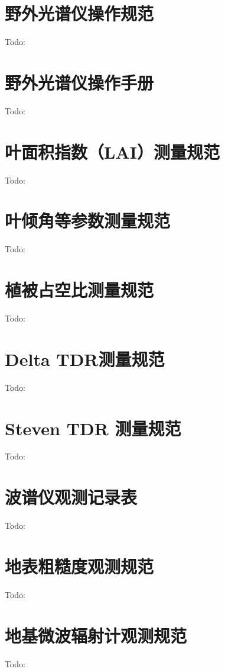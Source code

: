\documentclass[letterpaper,10pt,english]{sphinxmanual}
\begin{document}
\section{野外光谱仪操作规范}
\label{observe_standard:id6}
Todo:


\section{野外光谱仪操作手册}
\label{observe_standard:id7}
Todo:


\section{叶面积指数（LAI）测量规范}
\label{observe_standard:lai}
Todo:


\section{叶倾角等参数测量规范}
\label{observe_standard:id8}
Todo:


\section{植被占空比测量规范}
\label{observe_standard:id9}
Todo:


\section{Delta TDR测量规范}
\label{observe_standard:delta-tdr}
Todo:


\section{Steven TDR 测量规范}
\label{observe_standard:steven-tdr}
Todo:


\section{波谱仪观测记录表}
\label{observe_standard:id10}
Todo:


\section{地表粗糙度观测规范}
\label{observe_standard:id11}
Todo:


\section{地基微波辐射计观测规范}
\label{observe_standard:id12}
Todo:
\end{document}
